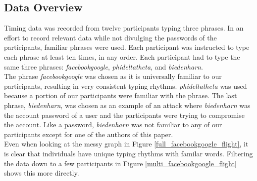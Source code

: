 \documentclass{article}
\begin{document}
\subsection{Data Overview}
Timing data was recorded from twelve participants typing three phrases. In an effort to record relevant data while not divulging the passwords of the participants, familiar phrases were used. Each participant was instructed to type each phrase at least ten times, in any order. Each participant had to type the same three phrases: \textit{facebookgoogle}, \textit{phideltatheta}, and \textit{biedenharn}.\\

The phrase \textit{facebookgoogle} was chosen as it is universally familiar to our participants, resulting in very consistent typing rhythms. \textit{phideltatheta} was used because a portion of our participants were familiar with the phrase. The last phrase, \textit{biedenharn}, was chosen as an example of an attack where \textit{biedenharn} was the account password of a user and the participants were trying to compromise the account. Like a password, \textit{biedenharn} was not familiar to any of our participants except for one of the authors of this paper.\\

Even when looking at the messy graph in Figure \ref{full_facebookgoogle_flight}, it is clear that individuals have unique typing rhythms with familar words. Filtering the data down to a few participants in Figure \ref{multi_facebookgoogle_flight} shows this more directly.
\end{document}

